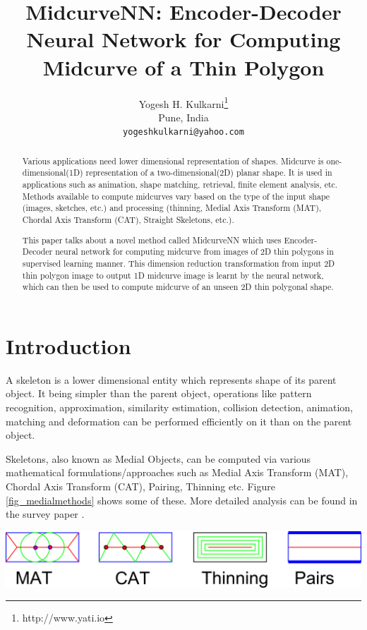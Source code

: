 \documentclass{article}
\title{MidcurveNN: Encoder-Decoder Neural Network for Computing Midcurve of a Thin Polygon}
\author{
  Yogesh H. Kulkarni\thanks{http://www.yati.io} \\
  Pune, India\\
  \texttt{yogeshkulkarni@yahoo.com} \\
}
\begin{document}
\maketitle

\begin{abstract}
Various applications need lower dimensional representation of shapes. Midcurve is one-dimensional(1D) representation of a two-dimensional(2D) planar shape. It is used in applications such as animation, shape matching, retrieval, finite element analysis, etc. Methods available to compute midcurves vary based on the type of the input shape (images, sketches, etc.) and processing (thinning, Medial Axis Transform (MAT), Chordal Axis Transform (CAT), Straight Skeletons, etc.).

This paper talks about a novel method called MidcurveNN which uses Encoder-Decoder neural network for computing midcurve from images of 2D thin polygons in supervised learning manner. This dimension reduction transformation from input 2D thin polygon image to output 1D midcurve image is learnt by the neural network, which can then be used to compute midcurve of an unseen 2D thin polygonal shape. 
\end{abstract}



\section{Introduction}
A skeleton is a lower dimensional entity which represents shape of its parent object. It being simpler than the parent object, operations like pattern recognition, approximation, similarity estimation, collision detection, animation, matching and deformation can be performed efficiently on it than on the parent object. 

Skeletons, also known as Medial Objects, can be computed via various mathematical formulations/approaches such as Medial Axis Transform (MAT), Chordal Axis Transform (CAT), Pairing, Thinning etc. Figure \ref{fig_medialmethods} shows some of these. More detailed analysis can be found in the survey paper \cite{medial2010}.

    \begin{center}
	\includegraphics[width=\linewidth]{images/MedialMethodsOnlyShort}
	\label{fig_medialmethods}
    \end{center}
    
\end{document}
